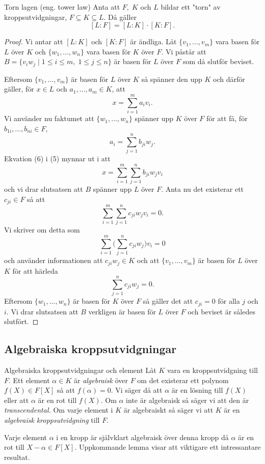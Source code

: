 \documentclass{article}
\theoremstyle{definition}
\begin{document}
\begin{mytheo}{Torn lagen (eng. tower law)}{}
  Anta att $F, \; K$ och $L$ bildar ett "torn" av kroppsutvidgningar, $F \subseteq K \subseteq L$. Då gäller
  \[ [L:F] = [L:K] \cdot [K:F]. \]
\end{mytheo}
\begin{proof}
  Vi antar att $[L:K]$ och $[K:F]$ är ändliga. Låt $\{v_1, \ldots, v_m\}$ vara basen för $L$ över $K$ och $\{w_1, \ldots, w_n\}$ vara basen för $K$ över $F$.
  Vi påstår att $B = \{v_iw_j \; | \; 1 \leq i \leq m, \; 1 \leq j \leq n\}$ är basen för $L$ över $F$ som då slutför beviset.

  Eftersom $\{v_1, \ldots, v_m\}$ är basen för $L$ över $K$ så spänner den upp $K$ och därför gäller, för $x \in L$ och $a_1, \ldots, a_m \in K$, att 
  \begin{equation}
    x = \sum_{i = 1}^m a_i v_i.
  \end{equation}
  Vi använder nu faktumet att $\{w_1, \ldots, w_n\}$ spänner upp $K$ över $F$ för att få, för 
  \linebreak
  $b_{1i}, \ldots, b_{ni} \in F$,
  \begin{equation}
    a_i = \sum_{j = 1}^n b_{ji}w_j.
  \end{equation}
  Ekvation (6) i (5) mynnar ut i att
  \[x = \sum_{i = 1}^m \sum_{j = 1}^n b_{ji}w_jv_i\]
  och vi drar slutsatsen att $B$ spänner upp $L$ över $F$. Anta nu det existerar ett $c_{ji} \in F$ så att 
  \[\sum_{i = 1}^m \sum_{j = 1}^n c_{ji}w_jv_i = 0.\]
  Vi skriver om detta som 
  \[\sum_{i = 1}^m \biggl( \sum_{j = 1}^n c_{ji}w_j \biggl) v_i = 0\]
  och använder informationen att $c_{ji}w_j \in K$ och att $\{v_1, \ldots, v_m\}$ är basen för $L$ över $K$ för att härleda
  \[\sum_{j = 1}^n c_{ji}w_j = 0.\]
  Eftersom $\{w_1, \ldots, w_n\}$ är basen för $K$ över $F$ så gäller det att $c_{ji} = 0$ för alla $j$ och $i$. Vi drar slutsatsen att 
  $B$ verkligen är basen för $L$ över $F$ och beviset är således slutfört. 
\end{proof}

\subsection{Algebraiska kroppsutvidgningar}
\begin{mydef}{Algebraiska kroppsutvidgningar och element}{}
  Låt $K$ vara en kroppsutvidgning till $F$. Ett element $\alpha \in K$ är \textit{algebraisk} över $F$ om det existerar ett polynom $f(X) \in F[X]$ 
  så att $f(\alpha) = 0.$ Vi säger då att $\alpha$ är en lösning till $f(X)$ eller att $\alpha$ är en rot till $f(X).$ Om $\alpha$ inte är algebraisk så säger 
  vi att den är \textit{transcendental.}
  Om varje element i $K$ är algebraiskt så säger vi att $K$ är en \textit{algebraisk kroppsutvidgning} till $F$.
\end{mydef}
Varje element $\alpha$ i en kropp är självklart algebraisk över denna kropp då $\alpha$ är en rot till $X - \alpha \in F[X]$. Uppkommande lemma visar att 
viktigare ett intressantare resultat. 
\end{document}
